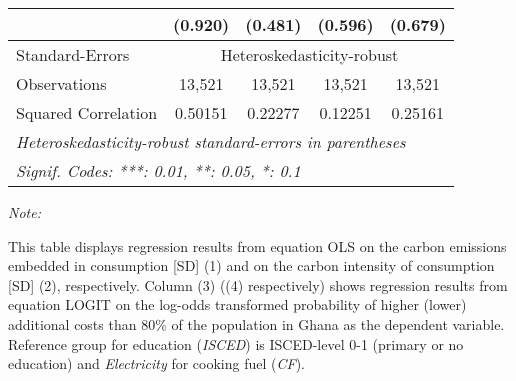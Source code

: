 \begin{table}[htbp!]
\begin{adjustbox}{width = 1\textwidth, max height = 0.95\textheight, center}
\begin{threeparttable}[b]
\begin{tabular}{lcccc}
                                 & (0.920)            & (0.481)            & (0.596)       & (0.679)\\   
            \midrule 
            Standard-Errors & \multicolumn{4}{c}{Heteroskedasticity-robust} \\ 
            Observations         & 13,521             & 13,521             & 13,521        & 13,521\\  
            Squared Correlation  & 0.50151            & 0.22277            & 0.12251       & 0.25161\\  
            \midrule \midrule
            \multicolumn{5}{l}{\emph{Heteroskedasticity-robust standard-errors in parentheses}}\\
            \multicolumn{5}{l}{\emph{Signif. Codes: ***: 0.01, **: 0.05, *: 0.1}}\\
         \end{tabular}
         
         \begin{tablenotes}\item \medskip \textit{Note:}
            \item This table displays regression results from equation OLS on the carbon emissions embedded in consumption [SD] (1) and on the carbon intensity of consumption [SD] (2), respectively. 
                                      Column (3) ((4) respectively) shows regression results from equation LOGIT on the log-odds transformed probability of higher (lower) additional costs than 80\% of the population in Ghana as the dependent variable. Reference group for education (\textit{ISCED}) is ISCED-level 0-1 (primary or no education) and \textit{Electricity} for cooking fuel (\textit{CF}).
         \end{tablenotes}
      \end{threeparttable}
   \end{adjustbox}
\end{table}


